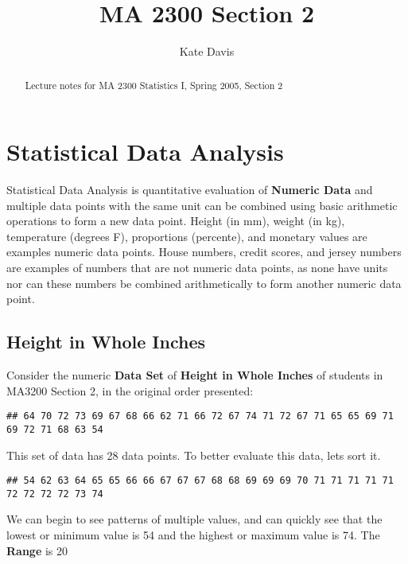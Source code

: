 \documentclass[nohyper,justified]{tufte-handout}\usepackage[]{graphicx}\usepackage[]{color}
\title{MA 2300 Section 2}
\author{Kate Davis}
\makeatletter
\newenvironment{kframe}{%
 \def\at@end@of@kframe{}%
 \ifinner\ifhmode%
  \def\at@end@of@kframe{\end{minipage}}%
  \begin{minipage}{\columnwidth}%
 \fi\fi%
 \def\FrameCommand##1{\hskip\@totalleftmargin \hskip-\fboxsep
 \colorbox{shadecolor}{##1}\hskip-\fboxsep
     \hskip-\linewidth \hskip-\@totalleftmargin \hskip\columnwidth}%
 \MakeFramed {\advance\hsize-\width
   \@totalleftmargin\z@ \linewidth\hsize
   \@setminipage}}%
 {\par\unskip\endMakeFramed%
 \at@end@of@kframe}
\newenvironment{knitrout}{}{} %
\makeatother
\begin{document}
\maketitle
\begin{abstract}
Lecture notes for MA 2300 Statistics I, Spring 2005, Section 2
\end{abstract}

\section{Statistical Data Analysis}

Statistical Data Analysis is quantitative evaluation of \textbf{Numeric Data} and multiple data points with the same unit can be combined using basic arithmetic operations to form a new data point. Height (in mm), weight (in kg), temperature (degrees F), proportions (percente), and monetary values are examples numeric data points. House numbers, credit scores, and jersey numbers are examples of numbers that are not numeric data points, as none have units nor can these numbers be combined arithmetically to form another numeric data point.

\subsection{Height in Whole Inches}

Consider the numeric \textbf{Data Set} of \textbf{Height in Whole Inches} of students in MA3200 Section 2, in the original order presented:

\begin{knitrout}
\color{fgcolor}\begin{kframe}
\begin{verbatim}
## 64 70 72 73 69 67 68 66 62 71 66 72 67 74 71 72 67 71 65 65 69 71 69 72 71 68 63 54
\end{verbatim}
\end{kframe}
\end{knitrout}

This set of data has 28 data points. To better evaluate this data, lets sort it.

\begin{fullwidth}
\begin{knitrout}
\color{fgcolor}\begin{kframe}
\begin{verbatim}
## 54 62 63 64 65 65 66 66 67 67 67 68 68 69 69 69 70 71 71 71 71 71 72 72 72 72 73 74
\end{verbatim}
\end{kframe}
\end{knitrout}
\end{fullwidth}

We can begin to see patterns of multiple values, and can quickly see that the lowest or minimum value is 54 and the highest or maximum value is 74. The \textbf{Range} is 20
\end{document}
